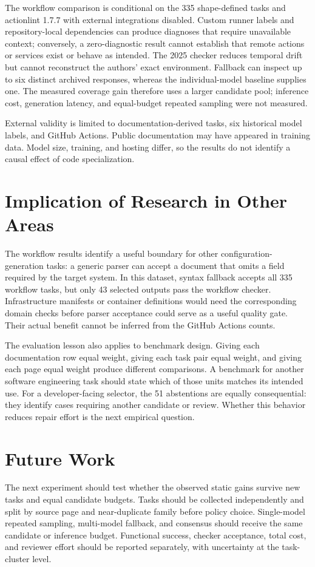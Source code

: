 The workflow comparison is conditional on the 335 shape-defined tasks and actionlint 1.7.7 with external integrations disabled. Custom runner labels and repository-local dependencies can produce diagnoses that require unavailable context; conversely, a zero-diagnostic result cannot establish that remote actions or services exist or behave as intended. The 2025 checker reduces temporal drift but cannot reconstruct the authors' exact environment. Fallback can inspect up to six distinct archived responses, whereas the individual-model baseline supplies one. The measured coverage gain therefore uses a larger candidate pool; inference cost, generation latency, and equal-budget repeated sampling were not measured.

External validity is limited to documentation-derived tasks, six historical model labels, and GitHub Actions. Public documentation may have appeared in training data. Model size, training, and hosting differ, so the results do not identify a causal effect of code specialization.

\section{Implication of Research in Other Areas}
The workflow results identify a useful boundary for other configuration-generation tasks: a generic parser can accept a document that omits a field required by the target system. In this dataset, syntax fallback accepts all 335 workflow tasks, but only 43 selected outputs pass the workflow checker. Infrastructure manifests or container definitions would need the corresponding domain checks before parser acceptance could serve as a useful quality gate. Their actual benefit cannot be inferred from the GitHub Actions counts.

The evaluation lesson also applies to benchmark design. Giving each documentation row equal weight, giving each task pair equal weight, and giving each page equal weight produce different comparisons. A benchmark for another software engineering task should state which of those units matches its intended use. For a developer-facing selector, the 51 abstentions are equally consequential: they identify cases requiring another candidate or review. Whether this behavior reduces repair effort is the next empirical question.

\section{Future Work}
The next experiment should test whether the observed static gains survive new tasks and equal candidate budgets. Tasks should be collected independently and split by source page and near-duplicate family before policy choice. Single-model repeated sampling, multi-model fallback, and consensus should receive the same candidate or inference budget. Functional success, checker acceptance, total cost, and reviewer effort should be reported separately, with uncertainty at the task-cluster level.

